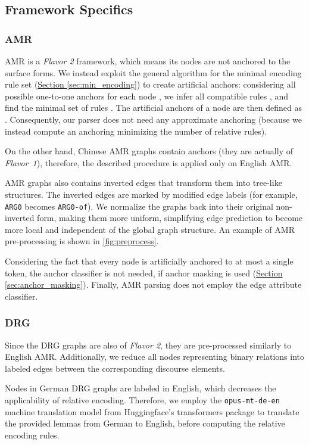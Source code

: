 \documentclass[11pt,a4paper]{article}
\newcommand{\secref}[1]{\hyperref[#1]{Section \ref*{#1}}}
\begin{document}
\subsection{Framework Specifics}
\label{sec:specifics}

\subsubsection{AMR}
\label{sec:amr}

AMR is a \emph{Flavor 2} framework, which means its nodes are not anchored to the surface forms. We instead exploit the general algorithm for the minimal encoding rule set (\secref{sec:min_encoding}) to create artificial anchors: considering all possible one-to-one anchors  for each node , we infer all compatible rules , and find the minimal set of rules . The artificial anchors of a node  are then defined as . Consequently, our parser does not need any approximate anchoring (because we instead compute an anchoring minimizing the number of relative rules).

On the other hand, Chinese AMR graphs contain anchors (they are actually of \hbox{\emph{Flavor 1}}), therefore, the described procedure is applied only on English AMR.

AMR graphs also contains inverted edges that transform them into tree-like structures. The inverted edges are marked by modified edge labels (for example, \texttt{ARG0} becomes \texttt{ARG0-of}). We normalize the graphs back into their original non-inverted form, making them more uniform, simplifying edge prediction to become more local and independent of the global graph structure. An example of AMR pre-processing is shown in \autoref{fig:preprocess}.

Considering the fact that every node is artificially anchored to at most a single token, the anchor classifier is not needed, if anchor masking is used (\secref{sec:anchor_masking}). Finally, AMR parsing does not employ the edge attribute classifier.

\subsubsection{DRG}
Since the DRG graphs are also of \emph{Flavor 2}, they are pre-processed similarly to English AMR. Additionally, we reduce all nodes representing binary relations into labeled edges between the corresponding discourse elements.

Nodes in German DRG graphs are labeled in English, which decreases the applicability of relative encoding. Therefore, we employ the \texttt{opus-mt-de-en} \cite{tiedemann2020building} machine translation model from Huggingface's transformers package \cite{wolf2019huggingface} to translate the provided lemmas from German to English, before computing the relative encoding rules.
\end{document}
